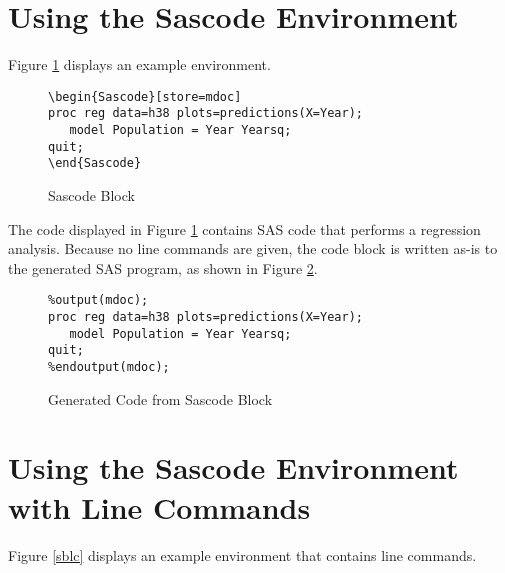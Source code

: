 \documentclass[article,oneside]{memoir}
\begin{document}
\section{Using the Sascode Environment}\label{scex}
Figure \ref{sb} displays an example  environment.

\begin{figure}[H]
\begin{snugshade}
\begin{verbatim}
\begin{Sascode}[store=mdoc]
proc reg data=h38 plots=predictions(X=Year);
   model Population = Year Yearsq;
quit;
\end{Sascode}
\end{verbatim}
\end{snugshade}
\caption{Sascode Block}\label{sb}
\end{figure}
  The code displayed in Figure \ref{sb} contains SAS code that
performs a regression analysis. Because no line commands are given,
the code block is written as-is to the generated SAS program, as shown
in Figure \ref{figsb}.
\begin{figure}[H]
\begin{snugshade}
\begin{verbatim}
%output(mdoc);
proc reg data=h38 plots=predictions(X=Year);
   model Population = Year Yearsq;
quit;
%endoutput(mdoc);
\end{verbatim}
\end{snugshade}
\caption{Generated Code from Sascode Block }\label{figsb}
\end{figure}

\section{Using the Sascode Environment with Line Commands}\label{scexlc}
Figure \ref{sblc} displays an example
   environment that contains line commands.
\end{document}
